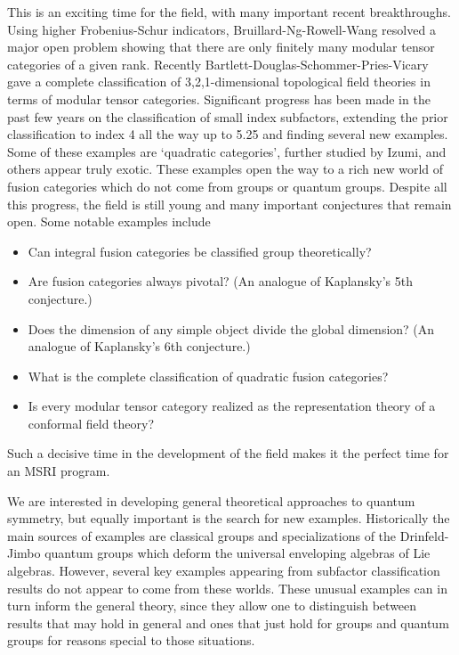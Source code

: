 \documentclass[11pt]{article}
\begin{document}
This is an exciting time for the field, with many important recent breakthroughs. Using higher Frobenius-Schur indicators, Bruillard-Ng-Rowell-Wang resolved a major open problem showing that there are only finitely many modular tensor categories of a given rank. Recently Bartlett-Douglas-Schommer-Pries-Vicary gave a complete classification of 3,2,1-dimensional topological field theories in terms of modular tensor categories. Significant progress has been made in the past few years on the classification of small index subfactors, extending the prior classification to index 4 all the way up to 5.25 and finding several new examples. Some of these examples are `quadratic categories', further studied by Izumi, and others appear truly exotic. These examples open the way to a rich new world of fusion categories which do not come from groups or quantum groups.  Despite all this progress, the field is still young and many important conjectures that remain open. Some notable examples include
\begin{itemize}
\item Can integral fusion categories  be classified group theoretically?
\item Are fusion categories always pivotal? (An analogue of Kaplansky's 5th conjecture.)
\item Does the dimension of any simple object divide the global dimension? (An analogue of Kaplansky's 6th conjecture.)
\item What is the complete classification of quadratic fusion categories?
\item Is every modular tensor category realized as the representation theory of a conformal field theory?
\end{itemize}
Such a decisive time in the development of the field makes it the perfect time for an MSRI program.

We are interested in developing general theoretical approaches to quantum symmetry, but equally important is the search for new examples. Historically the main sources of examples are classical groups and specializations of the Drinfeld-Jimbo quantum groups which deform the universal enveloping algebras of Lie algebras. However, several key examples appearing from subfactor classification results do not appear to come from these worlds. These unusual examples can in turn inform the general theory, since they allow one to distinguish between results that may hold in general and ones that just hold for groups and quantum groups for reasons special to those situations.
\end{document}
